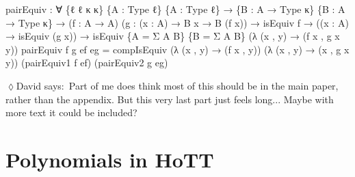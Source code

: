 \documentclass[
  11pt,
  oneside,
  article]{memoir}
\newenvironment{Shaded}{}{}
\newcommand{\NormalTok}[1]{#1}
\newcommand{\OtherTok}[1]{\textcolor[rgb]{0.00,0.44,0.13}{#1}}
\theoremstyle{definition}
\theoremstyle{plain}
\newcommand{\0}{\textsf{0}}
\newcommand{\1}{\tn{\textsf{1}}}
\newcommand{\dnote}[1]{{\quad \color{blue}$\lozenge$\;David says:}~#1\;{\color{blue}$\lozenge$}\quad}
\begin{document}
\begin{Shaded}
\begin{Highlighting}[]
\NormalTok{pairEquiv }\OtherTok{:} \OtherTok{∀} \OtherTok{\{}\NormalTok{ℓ ℓ\textquotesingle{} κ κ\textquotesingle{}}\OtherTok{\}} \OtherTok{\{}\NormalTok{A }\OtherTok{:}\NormalTok{ Type ℓ}\OtherTok{\}} \OtherTok{\{}\NormalTok{A\textquotesingle{} }\OtherTok{:}\NormalTok{ Type ℓ\textquotesingle{}}\OtherTok{\}}
            \OtherTok{→} \OtherTok{\{}\NormalTok{B }\OtherTok{:}\NormalTok{ A }\OtherTok{→}\NormalTok{ Type κ}\OtherTok{\}} \OtherTok{\{}\NormalTok{B\textquotesingle{} }\OtherTok{:}\NormalTok{ A\textquotesingle{} }\OtherTok{→}\NormalTok{ Type κ\textquotesingle{}}\OtherTok{\}}
            \OtherTok{→} \OtherTok{(}\NormalTok{f }\OtherTok{:}\NormalTok{ A }\OtherTok{→}\NormalTok{ A\textquotesingle{}}\OtherTok{)} \OtherTok{(}\NormalTok{g }\OtherTok{:} \OtherTok{(}\NormalTok{x }\OtherTok{:}\NormalTok{ A}\OtherTok{)} \OtherTok{→}\NormalTok{ B x }\OtherTok{→}\NormalTok{ B\textquotesingle{} }\OtherTok{(}\NormalTok{f x}\OtherTok{))}
            \OtherTok{→}\NormalTok{ isEquiv f }\OtherTok{→} \OtherTok{((}\NormalTok{x }\OtherTok{:}\NormalTok{ A}\OtherTok{)} \OtherTok{→}\NormalTok{ isEquiv }\OtherTok{(}\NormalTok{g x}\OtherTok{))}
            \OtherTok{→}\NormalTok{ isEquiv }\OtherTok{\{}\NormalTok{A }\OtherTok{=}\NormalTok{ Σ A B}\OtherTok{\}} \OtherTok{\{}\NormalTok{B }\OtherTok{=}\NormalTok{ Σ A\textquotesingle{} B\textquotesingle{}}\OtherTok{\}}
                      \OtherTok{(λ} \OtherTok{(}\NormalTok{x , y}\OtherTok{)} \OtherTok{→} \OtherTok{(}\NormalTok{f x , g x y}\OtherTok{))}
\NormalTok{pairEquiv f g ef eg }\OtherTok{=} 
\NormalTok{    compIsEquiv }\OtherTok{(λ} \OtherTok{(}\NormalTok{x , y}\OtherTok{)} \OtherTok{→} \OtherTok{(}\NormalTok{f x , y}\OtherTok{))} 
                \OtherTok{(λ} \OtherTok{(}\NormalTok{x , y}\OtherTok{)} \OtherTok{→} \OtherTok{(}\NormalTok{x , g x y}\OtherTok{))} 
                \OtherTok{(}\NormalTok{pairEquiv1 f ef}\OtherTok{)} 
                \OtherTok{(}\NormalTok{pairEquiv2 g eg}\OtherTok{)}
\end{Highlighting}
\end{Shaded}

\dnote{Part of me does think most of this should be in the main paper, rather than the appendix. But this very last part just feels long... Maybe with more text it could be included?} 

\chapter{Polynomials in HoTT}\label{polynomials-in-hott}
\end{document}
